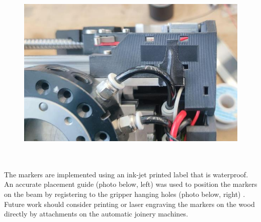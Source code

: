\documentclass[11pt]{book}
\begin{document}
\begin{figure}[H]
\includegraphics[width=14.33cm,height=9.24cm]{./images/image19.jpeg}
\end{figure}


The markers are implemented using an ink-jet printed label that is waterproof. An accurate placement guide (photo below, left) was used to position the markers on the beam by registering to the gripper hanging holes (photo below, right) . Future work should consider printing or laser engraving the markers on the wood directly by attachments on the automatic joinery machines.
\end{document}
